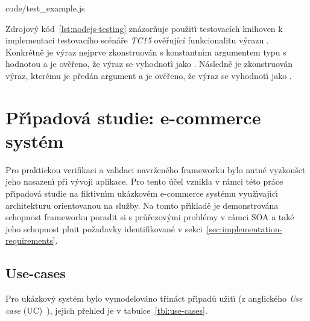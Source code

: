 
{code/test_example.js}

Zdrojov\'y kód~\ref{lst:nodejs-testing} znázorňuje použit\'{\i} testovacích knihoven k implementaci testovacího
scénáře \textit{TC15} ověřující funkcionalitu výrazu . Konkrétně je výraz nejprve zkonstruován s
konstantn\'{\i}m argumentem typu  s hodnotou  a je ověřeno, že v\'yraz se vyhodnot\'{\i}
jako . Následně je zkonstruován v\'yraz, kterému je předán argument  a je ověřeno,
že v\'yraz se vyhodnot\'{\i} jako .

\section{Př\'{\i}padová studie: e-commerce systém}

Pro praktickou verifikaci a validaci navrženého frameworku bylo nutné vyzkoušet
jeho nasazen\'{\i} při v\'yvoji aplikace. Pro tento účel vznikla v
rámci této práce př\'{\i}padová studie na fiktivn\'{\i}m
ukázkovém e-commerce systému využ\'{\i}vaj\'{\i}c\'{\i} architekturu orientovanou na služby.
Na tomto př\'{\i}kladě je demonstrována schopnost frameworku poradit si s průřezov\'ymi
problémy v rámci \gls{SOA} a také jeho schopnost plnit požadavky identifikované v
sekci~\ref{sec:implementation-requirements}.

\subsection{Use-cases}

Pro ukázkov\'y systém bylo vymodelováno třináct př\'{\i}padů užit\'{\i}
(z anglického \textit{Use case} (\gls{UC})~\cite{bittner2002use}), jejich
přehled je v tabulce~\ref{tbl:use-cases}.

